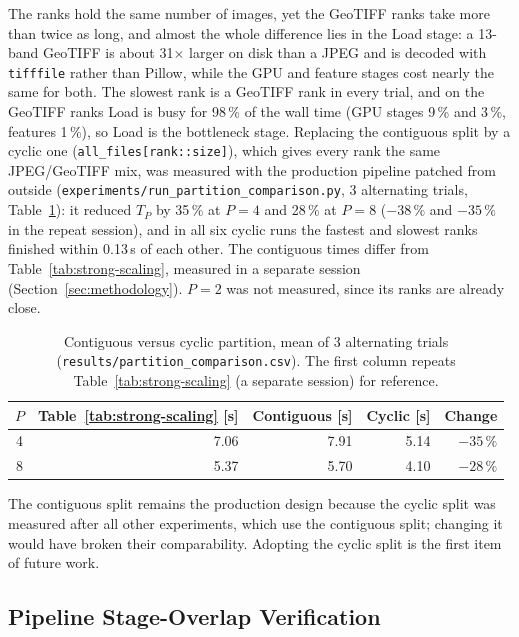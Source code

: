 \documentclass[a4paper,12pt]{report}
\begin{document}
The ranks hold the same number of images, yet the GeoTIFF ranks take
more than twice as long, and almost the whole difference lies in the Load
stage: a 13-band GeoTIFF is about
31$\times$ larger on disk than a JPEG and is decoded with
\texttt{tifffile} rather than Pillow, while the GPU and feature stages
cost nearly the same for both. The slowest rank is a GeoTIFF rank in every
trial, and on the GeoTIFF ranks Load is busy for 98\,\% of the wall time (GPU
stages 9\,\% and 3\,\%, features 1\,\%), so Load is the bottleneck stage.
Replacing the contiguous split by a cyclic one
(\texttt{all\_files[rank::size]}), which gives every rank the same
JPEG/GeoTIFF mix, was measured with the production pipeline patched from
outside (\texttt{experiments\slash{}run\_\discretionary{}{}{}partition\_\discretionary{}{}{}comparison.py}, 3
alternating trials, Table~\ref{tab:partition}): it reduced $T_P$ by 35\,\% at
$P=4$ and 28\,\% at $P=8$ ($-38\,\%$ and $-35\,\%$ in the repeat session), and in
all six cyclic runs the fastest and slowest ranks finished within 0.13\,s of each
other. The contiguous times differ from Table~\ref{tab:strong-scaling}, measured in
a separate session (Section~\ref{sec:methodology}). $P=2$ was not measured, since
its ranks are already close.

\begin{table}[H]
\centering
\caption{Contiguous versus cyclic partition, mean of 3 alternating trials
(\texttt{results\slash{}partition\_\discretionary{}{}{}comparison.csv}). The first column repeats
Table~\ref{tab:strong-scaling} (a separate session) for reference.}
\label{tab:partition}
\begin{tabular}{@{}crrrr@{}}
\toprule
$P$ & \textbf{Table~\ref{tab:strong-scaling} [s]} & \textbf{Contiguous [s]} &
\textbf{Cyclic [s]} & \textbf{Change} \\
\midrule
4 & 7.06 & 7.91 & 5.14 & $-35\,\%$ \\
8 & 5.37 & 5.70 & 4.10 & $-28\,\%$ \\
\bottomrule
\end{tabular}
\end{table}

The contiguous split remains the production design because the cyclic split was
measured after all other experiments, which use the contiguous split; changing it
would have broken their comparability. Adopting the cyclic split is the first item of
future work.

\subsection{Pipeline Stage-Overlap Verification}
\label{sec:pipeline-overlap-verification}
\end{document}
